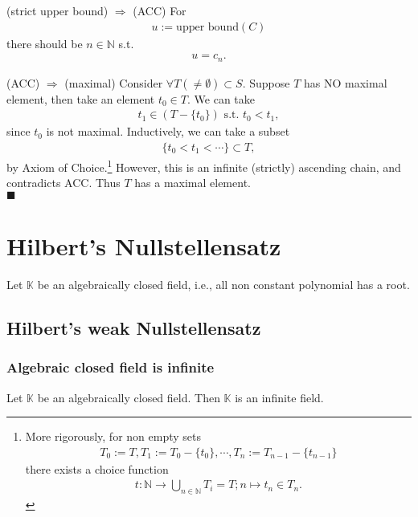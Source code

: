 \documentclass[11pt]{book}
\begin{document}
(strict upper bound) $\Rightarrow$ (ACC)
For
\begin{eqnarray}
u := \text{upper bound}(C)
\end{eqnarray}
there should be $n \in \mathbb{N}$ s.t.
\begin{eqnarray}
u = c_n.
\end{eqnarray}

(ACC) $\Rightarrow$ (maximal)
Consider $\forall T (\neq \emptyset) \subset S$.
Suppose $T$ has NO maximal element, then take an element $t_0 \in T$.
We can take
\begin{eqnarray}
t_1 \in (T - \{t_0\}) \text{ s.t. } t_0 < t_1,
\end{eqnarray}
since $t_0$ is not maximal.
Inductively, we can take a subset
\begin{eqnarray}
\{t_0 < t_1 < \cdots \} \subset T,
\end{eqnarray}
by Axiom of Choice.\footnote{
More rigorously, for non empty sets
\begin{eqnarray}
T_0 := T, T_1 := T_0 - \{t_0\}, \cdots, T_n := T_{n-1}-\{t_{n-1}\}
\end{eqnarray}
there exists a choice function
\begin{eqnarray}
t: \mathbb{N} \to \bigcup_{n \in \mathbb{N}} T_i = T; n \mapsto t_n \in T_n.
\end{eqnarray}

}
However, this is an infinite (strictly) ascending chain, and contradicts ACC.
Thus $T$ has a maximal element.\\
$\blacksquare$

\chapter{Hilbert's Nullstellensatz}
Let $\mathbb{K}$ be an algebraically closed field, i.e., all non constant polynomial has a root.

\section{Hilbert's weak Nullstellensatz}
\subsection{Algebraic closed field is infinite}
Let $\mathbb{K}$ be an algebraically closed field.
Then $\mathbb{K}$ is an infinite field.
\end{document}
